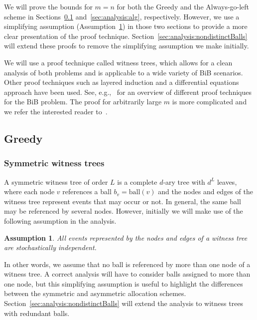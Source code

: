 \documentclass[a4paper,12pt]{article}
\newtheorem{assumption}{Assumption}
\begin{document}
We will prove the bounds for $m=n$ for both the Greedy and the Always-go-left scheme in Sections~\ref{sec:analysis:greedy} and~\ref{sec:analysis:alg}, respectively. However, we use a simplifying assumption (Assumption~\ref{assumption:independence}) in those two sections to provide a more clear presentation of the proof technique. Section~\ref{sec:analysis:nondistinctBalls} will extend these proofs to remove the simplifying assumption we make initially. 

We will use a proof technique called witness trees, which allows for a clean analysis of both problems and is applicable to a wide variety of BiB scenarios. Other proof techniques such as layered induction and a differential equations approach have been used. See, e.g.,~\cite{MRS01} for an overview of different proof techniques for the BiB problem. The proof for arbitrarily large $m$ is more complicated and we refer the interested reader to~\cite{BCSV06, TW13}.

\subsection{Greedy}
\label{sec:analysis:greedy}

\subsubsection{Symmetric witness trees}
\label{sec:analysis:definitionSymWT}
A symmetric witness tree of order $L$ is a complete $d$-ary tree with $d^{L}$ leaves, where each node $v$ references a ball $b_v = \mathrm{ball}(v)$ and the nodes and edges of the witness tree represent events that may occur or not. In general, the same ball may be referenced by several nodes. However, initially we will make use of the following assumption in the analysis.
\begin{assumption}
\label{assumption:independence}
All events represented by the nodes and edges of a witness tree are stochastically independent. 
\end{assumption}
In other words, we assume that no ball is referenced by more than one node of a witness tree. A correct analysis will have to consider balls assigned to more than one node, but this simplifying assumption is useful to highlight the differences between the symmetric and asymmetric allocation schemes. Section~\ref{sec:analysis:nondistinctBalls} will extend the analysis to witness trees with redundant balls.
\end{document}

